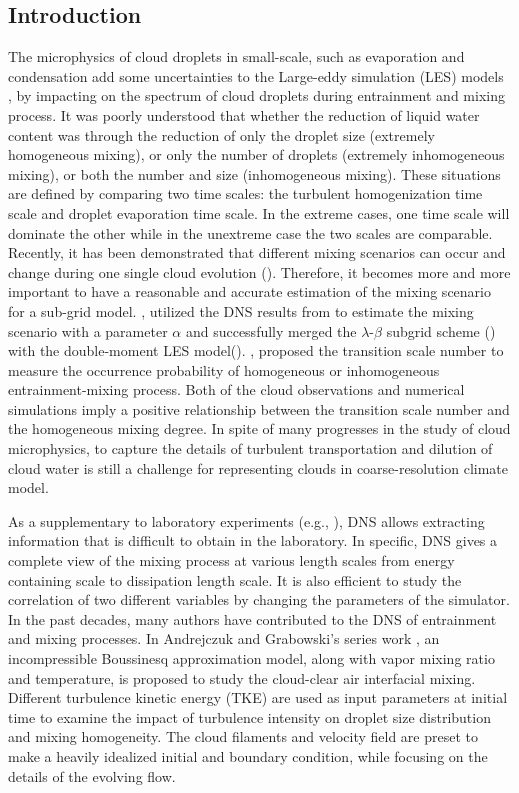 \documentclass[draft,jgrga]{AGUTeX}
\begin{document}
\begin{article}

\section{Introduction}
The microphysics of cloud droplets in small-scale, such as evaporation and condensation add some uncertainties to the Large-eddy simulation (LES) models \cite{Jarecka2013}, by impacting on the spectrum of cloud droplets during entrainment and mixing process. It was poorly understood that whether the reduction of liquid water content was through the reduction of only the droplet size (extremely homogeneous mixing), or only the number of droplets (extremely inhomogeneous mixing), or both the number and size (inhomogeneous mixing). These situations are defined by comparing two time scales: the turbulent homogenization time scale and droplet evaporation time scale. In the extreme cases, one time scale will dominate the other while in the unextreme case the two scales are comparable. Recently, it has been demonstrated that different mixing scenarios can occur and change during one single cloud evolution (\cite{And09,Burnet07,Lehmann09}). Therefore, it becomes more and more important to have a reasonable and accurate estimation of the mixing scenario for a sub-grid model. \cite{Jarecka2013}, utilized the DNS results from \cite{And04,And06,And09}  to estimate the mixing scenario with a parameter $\alpha$ and successfully merged the $\lambda$-$\beta$ subgrid scheme (\cite{Jarecka2009}) with the double-moment LES model(\cite{Morrison2008}). \cite{Lu2013}, proposed the transition scale number to measure the occurrence probability of homogeneous or inhomogeneous entrainment-mixing process. Both of the cloud observations and numerical simulations imply a positive relationship between the transition scale number and the homogeneous mixing degree. In spite of many progresses in the study of cloud microphysics, to capture the details of turbulent transportation and dilution of cloud water is still a challenge for representing clouds in coarse-resolution climate model.
   
As a supplementary to laboratory experiments (e.g., \cite{Malinowski1998}), DNS allows extracting information that is difficult to obtain in the laboratory. In specific, DNS gives a complete view of the mixing process at various length scales from energy containing scale to dissipation length scale.
It is also efficient to study the correlation of two different variables by changing the parameters of the simulator. In the past decades, many authors have contributed to the DNS
of entrainment and mixing processes. In Andrejczuk and Grabowski's series work \cite{And04,And06,And09}, an incompressible Boussinesq approximation model, along with vapor mixing ratio and temperature, is proposed to study the cloud-clear air interfacial mixing. Different turbulence kinetic energy (TKE) are used as input parameters at initial time to examine the impact of turbulence intensity on droplet size distribution and mixing homogeneity. The cloud filaments and velocity field are preset to make a heavily idealized initial and boundary condition, while focusing on the details of the evolving flow. 


\end{article}
\end{document}
